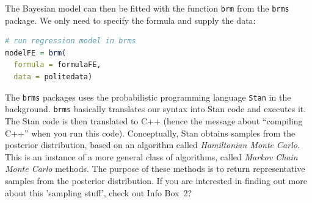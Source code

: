 \documentclass[nobib]{tufte-handout}
\begin{document}
The Bayesian model can then be fitted with the function \texttt{brm} from the \texttt{brms} package. We only need to specify the formula and supply the data:

\bigskip

\begin{minipage}[]{\textwidth}
\begin{lstlisting}[language=R]
# run regression model in brms
modelFE = brm(
  formula = formulaFE,
  data = politedata)
\end{lstlisting}
\end{minipage}

\noindent The \texttt{brms} packages uses the probabilistic programming language \texttt{Stan}
in the background. \texttt{brms} basically translates our syntax into Stan code and
executes it. The Stan code  is then translated to C++ (hence the message about ``compiling
C++'' when you run this code). Conceptually, Stan obtains samples from the posterior
distribution, based on an algorithm called \emph{Hamiltonian Monte Carlo}. This is an instance
of a more general class of algorithms, called \emph{Markov Chain Monte Carlo} methods. The
purpose of these methods is to return representative samples from the posterior distribution.
If you are interested in finding out more about this 'sampling stuff', check out Info Box~2?
\end{document}
